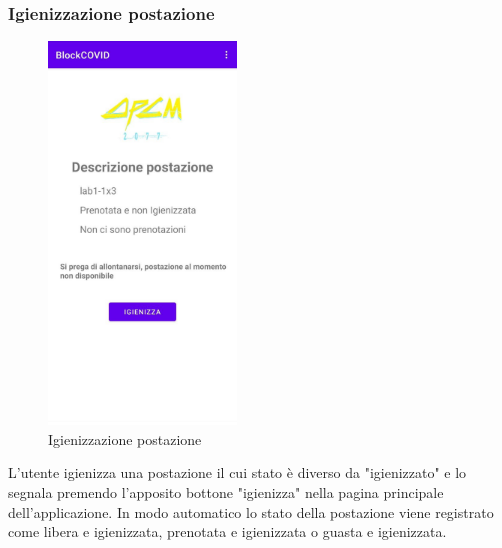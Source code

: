 	\subsubsection{Igienizzazione postazione}
	\begin{figure}[H]
		\centering
		\includegraphics[width=5cm]{res/images/DescrizionePostazione3.png}
		\caption{Igienizzazione postazione}
	\end{figure}
	L'utente igienizza una postazione il cui stato è diverso da "igienizzato" e lo segnala premendo l'apposito bottone "igienizza" nella pagina principale dell'applicazione. In modo automatico lo stato della postazione viene registrato come libera e igienizzata, prenotata e igienizzata o guasta e igienizzata.
